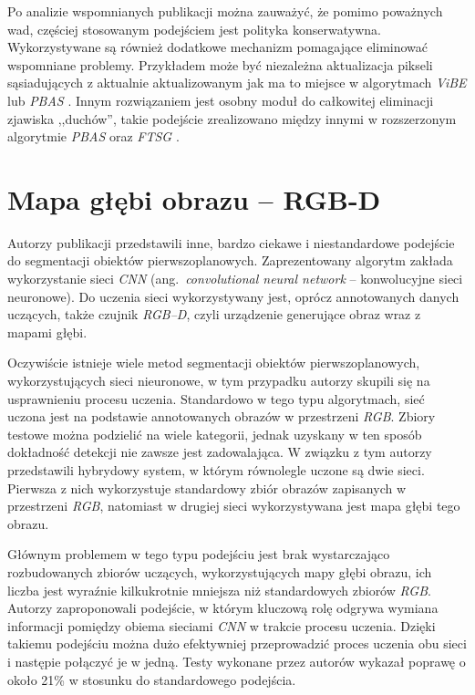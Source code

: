 Po analizie wspomnianych publikacji można zauważyć, że pomimo poważnych wad, częściej stosowanym podejściem jest polityka konserwatywna. Wykorzystywane są również dodatkowe mechanizm pomagające eliminować wspomniane problemy. 
Przykładem może być niezależna aktualizacja pikseli sąsiadujących z aktualnie aktualizowanym jak ma to miejsce w algorytmach \textit{ViBE} \cite{kryjak_13_vibe} lub \textit{PBAS} \cite{kryjak_13_pbas}. 
Innym rozwiązaniem jest osobny moduł do całkowitej eliminacji zjawiska ,,duchów'', takie podejście zrealizowano między innymi w rozszerzonym algorytmie \textit{PBAS} \cite{kryjak_14_pbas} oraz \textit{FTSG} \cite{wang_14}.

\section{Mapa głębi obrazu -- RGB-D}
\label{sec:rgbd}

Autorzy publikacji \cite{hoffman_16_rbgd} przedstawili inne, bardzo ciekawe i niestandardowe podejście do segmentacji obiektów pierwszoplanowych. Zaprezentowany algorytm zakłada wykorzystanie sieci \textit{CNN} (ang.~\textit{convolutional neural network} -- konwolucyjne sieci neuronowe). Do uczenia sieci wykorzystywany jest, oprócz annotowanych danych uczących, także czujnik \textit{RGB--D}, czyli urządzenie generujące obraz wraz z mapami głębi. 

Oczywiście istnieje wiele metod segmentacji obiektów pierwszoplanowych, wykorzystujących sieci nieuronowe, w tym przypadku autorzy skupili się na usprawnieniu procesu uczenia. Standardowo w tego typu algorytmach, sieć uczona jest na podstawie annotowanych obrazów w przestrzeni \textit{RGB}. Zbiory testowe można podzielić na wiele kategorii, jednak uzyskany w ten sposób dokładność detekcji nie zawsze jest zadowalająca. W związku z tym autorzy przedstawili hybrydowy system, w którym równolegle uczone są dwie sieci. Pierwsza z nich wykorzystuje standardowy zbiór obrazów zapisanych w przestrzeni \textit{RGB}, natomiast w drugiej sieci wykorzystywana jest mapa głębi tego obrazu.

Głównym problemem w tego typu podejściu jest brak wystarczająco rozbudowanych zbiorów uczących, wykorzystujących mapy głębi obrazu, ich liczba jest wyraźnie kilkukrotnie mniejsza niż standardowych zbiorów \textit{RGB}. Autorzy zaproponowali podejście, w którym kluczową rolę odgrywa wymiana informacji pomiędzy obiema sieciami \textit{CNN} w trakcie procesu uczenia. Dzięki takiemu podejściu można dużo efektywniej przeprowadzić proces uczenia obu sieci i następie połączyć je w jedną. Testy wykonane przez autorów wykazał poprawę o około \num{21}\% w stosunku do standardowego podejścia.



